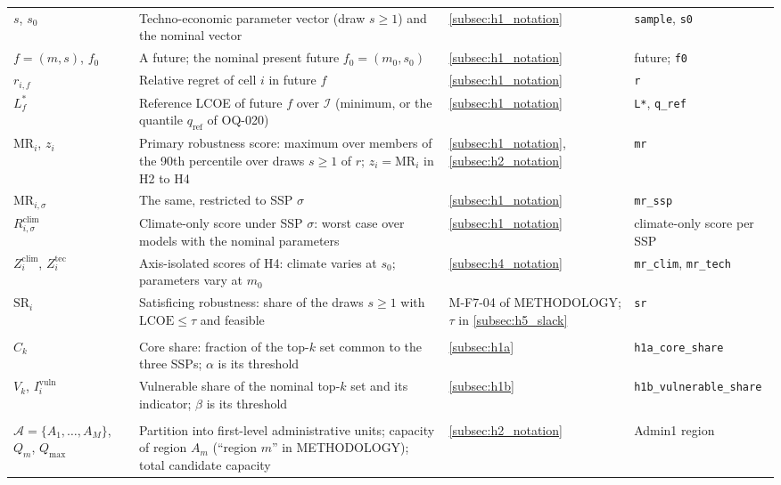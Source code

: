 \begin{longtable}{@{}p{}p{}p{}p{}@{}}
$s$, $s_0$ & Techno-economic parameter vector (draw $s\geq1$) and the nominal vector & \ref{subsec:h1_notation} & \texttt{sample}, \texttt{s0} \\
$f=(m,s)$, $f_0$ & A future; the nominal present future $f_0=(m_0,s_0)$ & \ref{subsec:h1_notation} & future; \texttt{f0} \\
$r_{i,f}$ & Relative regret of cell $i$ in future $f$ & \ref{subsec:h1_notation} & \texttt{r} \\
$L^{*}_{f}$ & Reference LCOE of future $f$ over $\mathcal{I}$ (minimum, or the quantile $q_{\mathrm{ref}}$ of OQ-020) & \ref{subsec:h1_notation} & \texttt{L*}, \texttt{q\_ref} \\
$\mathrm{MR}_i$, $z_i$ & Primary robustness score: maximum over members of the 90th percentile over draws $s\geq1$ of $r$; $z_i=\mathrm{MR}_i$ in H2 to H4 & \ref{subsec:h1_notation}, \ref{subsec:h2_notation} & \texttt{mr} \\
$\mathrm{MR}_{i,\sigma}$ & The same, restricted to SSP $\sigma$ & \ref{subsec:h1_notation} & \texttt{mr\_ssp} \\
$R^{\mathrm{clim}}_{i,\sigma}$ & Climate-only score under SSP $\sigma$: worst case over models with the nominal parameters & \ref{subsec:h1_notation} & climate-only score per SSP \\
$Z^{\mathrm{clim}}_i$, $Z^{\mathrm{tec}}_i$ & Axis-isolated scores of H4: climate varies at $s_0$; parameters vary at $m_0$ & \ref{subsec:h4_notation} & \texttt{mr\_clim}, \texttt{mr\_tech} \\
$\mathrm{SR}_i$ & Satisficing robustness: share of the draws $s\geq1$ with $\mathrm{LCOE}\leq\tau$ and feasible & M-F7-04 of METHODOLOGY; $\tau$ in \ref{subsec:h5_slack} & \texttt{sr} \\
\addlinespace
\multicolumn{4}{@{}l}{\textit{H1}}\\
$C_k$ & Core share: fraction of the top-$k$ set common to the three SSPs; $\alpha$ is its threshold & \ref{subsec:h1a} & \texttt{h1a\_core\_share} \\
$V_k$, $I^{\mathrm{vuln}}_i$ & Vulnerable share of the nominal top-$k$ set and its indicator; $\beta$ is its threshold & \ref{subsec:h1b} & \texttt{h1b\_vulnerable\_share} \\
\addlinespace
\multicolumn{4}{@{}l}{\textit{H2}}\\
$\mathcal{A}=\{A_1,\dots,A_M\}$, $Q_m$, $Q_{\max}$ & Partition into first-level administrative units; capacity of region $A_m$ (``region $m$'' in METHODOLOGY); total candidate capacity & \ref{subsec:h2_notation} & Admin1 region \\

\end{longtable}

